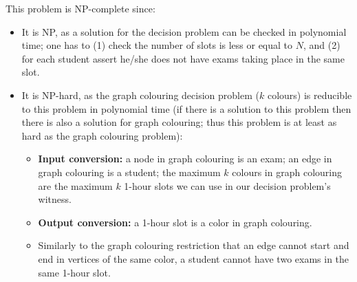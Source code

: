{This problem is NP-complete since:
\begin{itemize}
    \item It is NP, as a solution for the decision problem can be checked in polynomial time; one has to (1) check the number of slots is less or equal to $N$, and (2) for each student assert he/she does not have exams taking place in the same slot.
    \item It is NP-hard, as the graph colouring decision problem ($k$ colours) is reducible to this problem in polynomial time (if there is a solution to this problem then there is also a solution for graph colouring; thus this problem is at least as hard as the graph colouring problem):
    \begin{itemize}
        \item \textbf{Input conversion:} a node in graph colouring is an exam; an edge in graph colouring is a student; the maximum $k$ colours in graph colouring are the maximum $k$ 1-hour slots we can use in our decision problem's witness.
        \item \textbf{Output conversion:} a 1-hour slot is a color in graph colouring.
        \item Similarly to the graph colouring restriction that an edge cannot start and end in vertices of the same color, a student cannot have two exams in the same 1-hour slot.
    \end{itemize}
\end{itemize}


}
